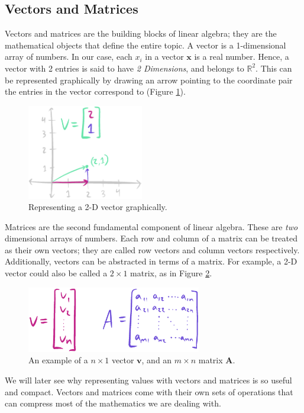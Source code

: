 \documentclass[12pt]{report}
\begin{document}
\subsection{Vectors and Matrices}
Vectors and matrices are the building blocks of linear algebra; they are the mathematical objects that define the entire topic.
A vector is a 1-dimensional array of numbers.
In our case, each $x_i$ in a vector $\textbf{x}$ is a real number.
Hence, a vector with 2 entries is said to have \emph{2 Dimensions}, and belongs to $\mathbb{R}^2$.
This can be represented graphically by drawing an arrow pointing to the coordinate pair the entries in the vector correspond to (Figure \ref{vector}).
\begin{figure}[hbt!]
    \centering
    \includegraphics[width=2in]{figures/vector.png}
    \caption{Representing a 2-D vector graphically.}
    \label{vector}
\end{figure}

Matrices are the second fundamental component of linear algebra. These are \emph{two} dimensional arrays of numbers.
Each row and column of a matrix can be treated as their own vectors; they are called row vectors and column vectors respectively.
Additionally, vectors can be abstracted in terms of a matrix. For example, a 2-D vector could also be called a $2 \times 1$ matrix, as in Figure \ref{vectormatrix}.
\begin{figure}[hbt!]
    \centering
    \includegraphics[width=3in]{figures/matrixvector.png}
    \caption{An example of a $n \times 1$ vector $\mathbf{v}$, and an $m \times n$ matrix $\textbf{A}$. }
    \label{vectormatrix}
\end{figure}
 We will later see why representing values with vectors and matrices is so useful and compact. Vectors and matrices come with their own sets of operations that can compress most of the mathematics we are dealing with.
\end{document}
